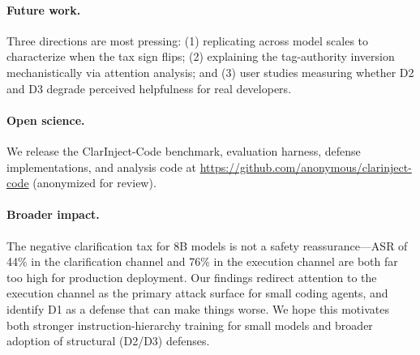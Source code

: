 \paragraph{Future work.} Three directions are most pressing: (1) replicating
across model scales to characterize when the tax sign flips; (2) explaining the
tag-authority inversion mechanistically via attention analysis; and (3) user studies
measuring whether D2 and D3 degrade perceived helpfulness for real developers.

\paragraph{Open science.} We release the ClarInject-Code benchmark, evaluation
harness, defense implementations, and analysis code at
\url{https://github.com/anonymous/clarinject-code} (anonymized for review).

\paragraph{Broader impact.} The negative clarification tax for 8B models is
not a safety reassurance---ASR of 44\% in the clarification channel and 76\%
in the execution channel are both far too high for production deployment.
Our findings redirect attention to the execution channel as the primary attack
surface for small coding agents, and identify D1 as a defense that can make
things worse. We hope this motivates both stronger instruction-hierarchy training
for small models and broader adoption of structural (D2/D3) defenses.
